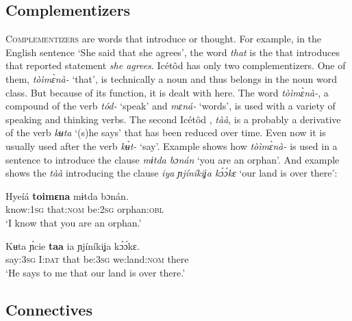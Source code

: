 \subsection{Complementizers}\label{sec:3.13}


\textsc{Complementizers} are words that introduce  or thought. For example, in the English sentence ‘She said that she agrees’, the word \textit{that} is the  that introduces that reported statement \textit{she agrees}. Icétôd has only two complementizers. One of them, \textit{tòìm\`{ɛ}nà-} ‘that’, is technically a noun and thus belongs in the noun word class. But because of its function, it is dealt with here. The word \textit{tòìm\`{ɛ}nà-}, a compound of the verb \textit{tód-} ‘speak’ and \textit{mɛná-} ‘words’, is used with a variety of speaking and thinking verbs. The second Icétôd , \textit{tàà}, is a probably a derivative of the verb \textit{kʉta} ‘(s)he says’ that has been reduced over time. Even now it is usually used after the verb \textit{k\`{ʉ}t-} ‘say’. Example  shows how \textit{tòìm\`{ɛ}nà-} is used in a sentence to introduce the clause \textit{mɨt{\Í}da bɔnán} ‘you are an orphan’. And example  shows the  \textit{tàà} introducing the clause \textit{iya ɲjíníkiʝa k\'{ɔ}\'{ɔ}kɛ} ‘our land is over there’:




\ea\label{ex:morph:9}
\gll Hyeíá   \textbf{toimɛna}   mɨt{\Í}da   bɔnán. \\
know:\textsc{1sg}   that:\textsc{nom}   be:\textsc{2sg}   orphan:\textsc{obl}    \\
\glt ‘I know that you are an orphan.’ 
\z




\ea\label{ex:morph:10}
\gll Kʉta   \'{ɲ}cie   \textbf{taa}   ia     ɲjíníkiʝa    k\'{ɔ}\'{ɔ}kɛ. \\
say:\textsc{3sg}   I:\textsc{dat}   that   be:\textsc{3sg}  we:land:\textsc{nom} there    \\
\glt ‘He says to me that our land is over there.’ 
\z






\subsection{Connectives}\label{sec:3.14}


